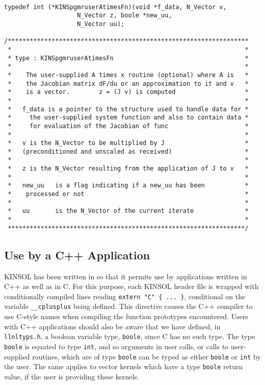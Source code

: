 \small
\begin{verbatim}

typedef int (*KINSpgmruserAtimesFn)(void *f_data, N_Vector v, 
				    N_Vector z, boole *new_uu, 
				    N_Vector uu);
  
/******************************************************************
 *                                                                *
 * type : KINSpgmruserAtimesFn                                    *
 *                                                                *
 *    The user-supplied A times x routine (optional) where A is   *
 *    the Jacobian matrix dF/du or an approximation to it and v   *
 *    is a vector.        z = (J v) is computed                   *
 *                                                                *
 *   f_data is a pointer to the structure used to handle data for *
 *     the user-supplied system function and also to contain data *
 *     for evaluation of the Jacobian of func                     *
 *                                                                *
 *   v is the N_Vector to be multiplied by J                      *
 *   (preconditioned and unscaled as received)                    *
 *                                                                *
 *   z is the N_Vector resulting from the application of J to v   *
 *                                                                * 
 *   new_uu   is a flag indicating if a new_uu has been           *
 *    processed or not                                            *
 *                                                                *
 *   uu       is the N_Vector of the current iterate              *
 *                                                                *
 *****************************************************************/

\end{verbatim}
\normalsize
 
\subsection{Use by a C++ Application}

KINSOL has been written in so that it permits use by
applications written in C++ as well as in C.  For this purpose, each
KINSOL header file is wrapped with conditionally compiled lines reading
{\tt extern "C" \{ ... \}}, conditional on the variable 
{\tt \_\_cplusplus} being defined.  This directive causes the C++
compiler to use C-style names when compiling the function prototypes
encountered.  Users with C++ applications should also be aware that we
have defined, in {\tt llnltyps.h}, a boolean variable type, 
{\tt boole}, since C has no such type.  The type {\tt boole} is
equated to type {\tt int}, and so arguments in user calls, or calls to
user-supplied routines, which are of type {\tt boole} can be typed as
either {\tt boole} or {\tt int} by the user.  The same applies to
vector kernels which have a type {\tt boole} return value, if the user
is providing these kernels.


